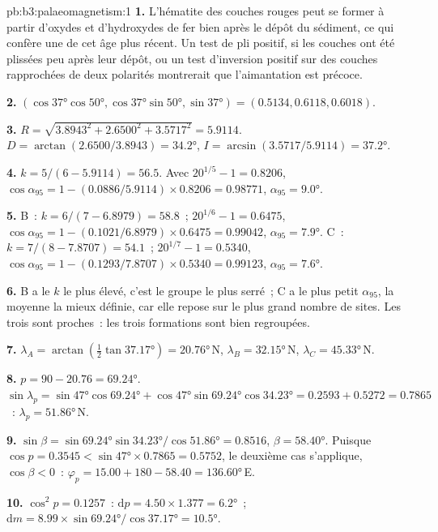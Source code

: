 \begin{solution}{pb:b3:palaeomagnetism:1}
\textbf{1.} L'hématite des couches rouges peut se former à partir d'oxydes et d'hydroxydes de fer
bien après le dépôt du sédiment, ce qui confère une  de cet
âge plus récent. Un test de pli positif, si les couches ont été plissées peu après
leur dépôt, ou un test d'inversion positif sur des couches rapprochées de
deux polarités montrerait que l'aimantation est précoce.

\textbf{2.} $(\cos\ang{37}\cos\ang{50}, \cos\ang{37}\sin\ang{50}, \sin\ang{37})
= (0.5134, 0.6118, 0.6018)$.

\textbf{3.} $R = \sqrt{3.8943^2 + 2.6500^2 + 3.5717^2} = 5.9114$. $D =
\arctan(2.6500/3.8943) = \ang{34.2}$, $I = \arcsin(3.5717/5.9114) = \ang{37.2}$.

\textbf{4.} $k = 5/(6 - 5.9114) = 56.5$. Avec $20^{1/5} - 1 = 0.8206$,
$\cos\alpha_{95} = 1 - (0.0886/5.9114)\times0.8206 = 0.98771$, $\alpha_{95} =
\ang{9.0}$.

\textbf{5.} B~: $k = 6/(7 - 6.8979) = 58.8$~; $20^{1/6} - 1 = 0.6475$,
$\cos\alpha_{95} = 1 - (0.1021/6.8979)\times0.6475 = 0.99042$, $\alpha_{95} =
\ang{7.9}$. C~: $k = 7/(8 - 7.8707) = 54.1$~; $20^{1/7} - 1 = 0.5340$,
$\cos\alpha_{95} = 1 - (0.1293/7.8707)\times0.5340 = 0.99123$, $\alpha_{95} =
\ang{7.6}$.

\textbf{6.} B a le $k$ le plus élevé, c'est le groupe le plus serré~; C a le plus petit
$\alpha_{95}$, la moyenne la mieux définie, car elle repose sur le plus grand nombre de sites. Les trois
sont proches~: les trois formations sont bien regroupées.

\textbf{7.} $\lambda_A = \arctan(\tfrac12\tan\ang{37.17}) = \ang{20.76}$\,N,
$\lambda_B = \ang{32.15}$\,N, $\lambda_C = \ang{45.33}$\,N.

\textbf{8.} $p = 90 - 20.76 = \ang{69.24}$. $\sin\lambda_p =
\sin\ang{47}\cos\ang{69.24} + \cos\ang{47}\sin\ang{69.24}\cos\ang{34.23} =
0.2593 + 0.5272 = 0.7865$~: $\lambda_p = \ang{51.86}$\,N.

\textbf{9.} $\sin\beta = \sin\ang{69.24}\sin\ang{34.23}/\cos\ang{51.86} =
0.8516$, $\beta = \ang{58.40}$. Puisque $\cos p = 0.3545 < \sin\ang{47}\times
0.7865 = 0.5752$, le deuxième cas s'applique, $\cos\beta < 0$~:
$\varphi_p = 15.00 + 180 - 58.40 = \ang{136.60}$\,E.

\textbf{10.} $\cos^2p = 0.1257$~: $\mathrm dp = 4.50\times1.377 = \ang{6.2}$~;
$\mathrm dm = 8.99\times\sin\ang{69.24}/\cos\ang{37.17} = \ang{10.5}$.


\end{solution}
